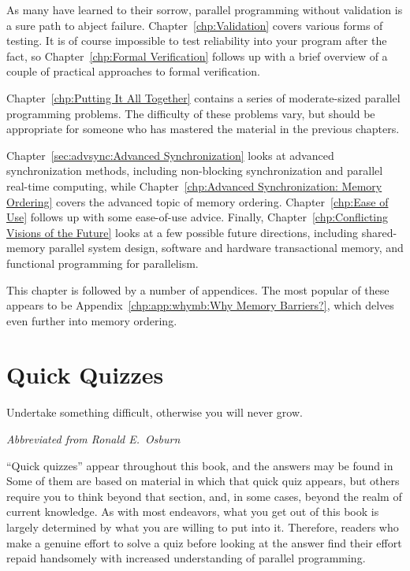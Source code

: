 As many have learned to their sorrow, parallel programming without
validation is a sure path to abject failure.
Chapter~\ref{chp:Validation} covers various forms of testing.
It is of course impossible to test reliability into your program
after the fact, so Chapter~\ref{chp:Formal Verification}
follows up with a brief overview of a couple of practical approaches to
formal verification.

Chapter~\ref{chp:Putting It All Together}
contains a series of moderate-sized parallel programming problems.
The difficulty of these problems vary, but should be appropriate for
someone who has mastered the material in the previous chapters.

Chapter~\ref{sec:advsync:Advanced Synchronization}
looks at advanced synchronization methods, including
non-blocking synchronization and parallel real-time computing,
while Chapter~\ref{chp:Advanced Synchronization: Memory Ordering}
covers the advanced topic of memory ordering.
Chapter~\ref{chp:Ease of Use} follows up with some ease-of-use advice.
Finally, Chapter~\ref{chp:Conflicting Visions of the Future}
looks at a few possible future directions, including
shared-memory parallel system design, software and hardware transactional
memory, and functional programming for parallelism.

This chapter is followed by a number of appendices.
The most popular of these appears to be
Appendix~\ref{chp:app:whymb:Why Memory Barriers?},
which delves even further into memory ordering.

\section{Quick Quizzes}
\label{sec:howto:Quick Quizzes}
%
\epigraph{Undertake something difficult, otherwise you will never grow.}
	 {\emph{Abbreviated from Ronald E.~Osburn}}

``Quick quizzes'' appear throughout this book, and the answers may
be found in
Some of them are based on material in which that quick quiz
appears, but others require you to think beyond that section, and,
in some cases, beyond the realm of current knowledge.
As with most endeavors, what you get out of this book is largely
determined by what you are willing to put into it.
Therefore, readers who make a genuine effort to solve a quiz before
looking at the answer
find their effort repaid handsomely with increased understanding
of parallel programming.

